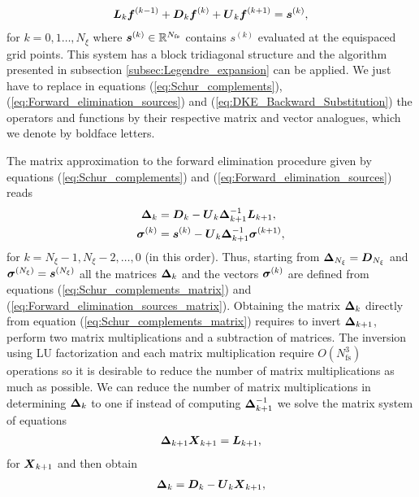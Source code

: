 \begin{align}
	\vb*{L}_k  \vb*{f}^{(k-1)} + \vb*{D}_k  \vb*{f}^{(k)} + \vb*{U}_k   \vb*{f}^{(k+1)} = \vb*{s}^{(k)},   \label{eq:DKE_Legendre_expansion_Fourier_collocation}
\end{align}
for $k=0,1\ldots, N_\xi$ where $\vb*{s}^{(k)}\in\mathbb{R}^{N_{\text{fs}}}$
contains $s^{(k)}$ evaluated at the equispaced grid points. This system has a block tridiagonal structure and the algorithm presented in subsection \ref{subsec:Legendre_expansion} can be applied. We just have to replace in equations (\ref{eq:Schur_complements}), (\ref{eq:Forward_elimination_sources}) and (\ref{eq:DKE_Backward_Substitution}) the operators and functions by their respective matrix and vector analogues, which we denote by boldface letters. 

The matrix approximation to the forward elimination procedure given by equations (\ref{eq:Schur_complements}) and (\ref{eq:Forward_elimination_sources}) reads
\begin{align}
	\vb*{\Delta}_k & = \vb*{D}_k - \vb*{U}_{k} \vb*{\Delta}_{k+1}^{-1} \vb*{L}_{k+1}, 
	\label{eq:Schur_complements_matrix}
	\\
	\vb*{\sigma}^{(k)} & = \vb*{s}^{(k)} - \vb*{U}_{k}  \vb*{\Delta}_{k+1}^{-1}    \vb*{\sigma}^{(k+1)},
	\label{eq:Forward_elimination_sources_matrix}
\end{align}
for $k=N_\xi-1, N_\xi-2, \ldots, 0$ (in this order). Thus, starting from $\vb*{\Delta}_{N_\xi}=\vb*{D}_{N_\xi}$ and $\vb*{\sigma}^{(N_\xi)}=\vb*{s}^{(N_\xi)}$ all the matrices $\vb*{\Delta}_k$ and the vectors $\vb*{\sigma}^{(k)}$ are defined from equations (\ref{eq:Schur_complements_matrix}) and (\ref{eq:Forward_elimination_sources_matrix}). Obtaining the matrix $\vb*{\Delta}_k$ directly from equation (\ref{eq:Schur_complements_matrix}) requires to invert $\vb*{\Delta}_{k+1}$, perform two matrix multiplications and a subtraction of matrices. The inversion using LU factorization and each matrix multiplication require $O(N_{\text{fs}}^3)$ operations so it is desirable to reduce the number of matrix multiplications as much as possible. We can reduce the number of matrix multiplications in determining $\vb*{\Delta}_{k}$ to one if instead of computing $\vb*{\Delta}_{k+1}^{-1}$ we solve the matrix system of equations
%
\begin{align}
	\vb*{\Delta}_{k+1} \vb*{X}_{k+1} = \vb*{L}_{k+1},
	\label{eq:Forward_elimination_X}  
\end{align}
for $\vb*{X}_{k+1}$ and then obtain 
%
\begin{align}
	\vb*{\Delta}_k = \vb*{D}_k - \vb*{U}_{k}\vb*{X}_{k+1}, 
	\label{eq:Schur_complements_Fourier_collocation}
\end{align}
